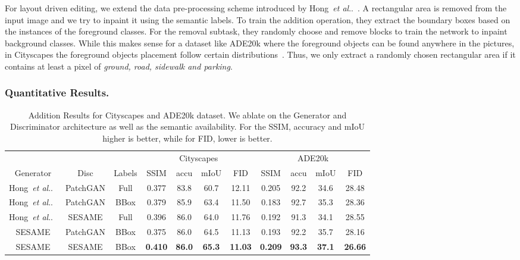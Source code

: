 \documentclass[runningheads]{llncs}
\makeatletter
\DeclareRobustCommand\onedot{\futurelet\@let@token\@onedot}
\def\@onedot{\ifx\@let@token.\else.\null\fi\xspace}
\def\etal{\emph{et al}\onedot}
\def\hong{Hong~\etal~\cite{hong2018learning}}
\makeatother
\begin{document}
For layout driven editing, we extend the data pre-processing scheme introduced by Hong~\etal~\cite{hong2018learning}.
A rectangular area is removed from the input image and we try to inpaint it using the semantic labels.
To train the addition operation, they extract the boundary boxes based on the instances of the foreground classes.
For the removal subtask, they randomly choose and remove blocks to train the network to inpaint background classes.
While this makes sense for a dataset like ADE20k where the foreground objects can be found anywhere in the pictures, in Cityscapes the foreground objects placement follow certain distributions~\cite{lee2018objectplacement}.
Thus, we only extract a randomly chosen rectangular area if it contains at least a pixel of \textit{ground, road, sidewalk and parking}.

\subsubsection{Quantitative Results.}
\label{ssc:quantitative_results}

\begin{table}[t]
\begin{center}
\caption{Addition Results for Cityscapes and ADE20k dataset. We ablate on the Generator and Discriminator architecture as well as the semantic availability. For the SSIM, accuracy and mIoU higher is better, while for FID, lower is better.}
\label{table:addition}
\begin{tabular}{c|c|c|cccc|cccc}
\multicolumn{3}{c}{} &  \multicolumn{4}{c}{Cityscapes} &  \multicolumn{4}{c}{ADE20k} \\
\cline{4-11}
Generator & Disc & Labels & SSIM & accu  & mIoU  & FID  & SSIM  & accu  & mIoU   & FID  \\
\hline
\hong{} & PatchGAN & Full & 0.377 & 83.8 & 60.7 & 12.11 & 0.205 & 92.2 & 34.6 & 28.48 \\
\hong{} & PatchGAN & BBox & 0.379 & 85.9 & 63.4 & 11.50 & 0.183 & 92.7 & 35.3 & 28.36 \\
\hong{} & SESAME & Full & 0.396 & 86.0 & 64.0 & 11.76 & 0.192 & 91.3 & 34.1 & 28.55 \\
SESAME & PatchGAN & BBox & 0.375 & 86.0 & 64.5 & 11.13 & 0.193 & 92.2 & 35.7 & 28.16 \\
SESAME & SESAME & BBox & \textbf{0.410}  & \textbf{86.0} & \textbf{65.3}  & \textbf{11.03} & \textbf{0.209} & \textbf{93.3} & \textbf{37.1} & \textbf{26.66} \\
\end{tabular}
\end{center}
\end{table}
\end{document}
